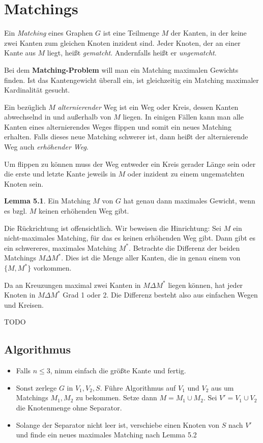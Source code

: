 \documentclass[10pt,a4paper]{article}
\begin{document}

\clearpage
\section{Matchings}
Ein \textit{Matching} eines Graphen $G$ ist eine Teilmenge $M$ der Kanten, in
der keine zwei Kanten zum gleichen Knoten inzident sind.
Jeder Knoten, der an einer Kante aus $M$ liegt, heißt \textit{gematcht}.
Andernfalls heißt er \textit{ungematcht}.

Bei dem \textbf{Matching-Problem} will man ein Matching maximalen Gewichts
finden.
Ist das Kantengewicht überall ein, ist gleichzeitig ein Matching maximaler
Kardinalität gesucht.

Ein bezüglich $M$ \textit{alternierender} Weg ist ein Weg oder Kreis, dessen
Kanten abwechselnd in und außerhalb von $M$ liegen.
In einigen Fällen kann man alle Kanten eines alternierendes Weges flippen und
somit ein neues Matching erhalten.
Falls dieses neue Matching schwerer ist, dann heißt der alternierende Weg auch
\textit{erhöhender Weg}.

Um flippen zu können muss der Weg entweder ein Kreis gerader Länge sein oder
die erste und letzte Kante jeweils in $M$ oder inzident zu einem ungematchten
Knoten sein.

\textbf{Lemma 5.1}. Ein Matching $M$ von $G$ hat genau dann maximales Gewicht,
wenn es bzgl. $M$ keinen erhöhenden Weg gibt.

Die Rückrichtung ist offensichtlich.
Wir beweisen die Hinrichtung:
Sei $M$ ein nicht-maximales Matching, für das es keinen erhöhenden Weg gibt.
Dann gibt es ein schwereres, maximales Matching $M^*$.
Betrachte die Differenz der beiden Matchings $M\Delta M^*$.
Dies ist die Menge aller Kanten, die in genau einem von $\{M, M^*\}$ vorkommen.

Da an Kreuzungen maximal zwei Kanten in $M\Delta M^*$ liegen können, hat jeder
Knoten in $M\Delta M^*$ Grad 1 oder 2.
Die Differenz besteht also aus einfachen Wegen und Kreisen.

TODO %

\subsection{Algorithmus}
\begin{itemize}
    \item Falls $n \leq 3$, nimm einfach die größte Kante und fertig.
    \item Sonst zerlege $G$ in $V_1, V_2, S$.
        Führe Algorithmus auf $V_1$ und $V_2$ aus um Matchings $M_1, M_2$ zu
        bekommen.
        Setze dann $M = M_1 \cup M_2$.
        Sei $V' = V_1 \cup V_2$ die Knotenmenge ohne Separator.
    \item Solange der Separator nicht leer ist, verschiebe einen Knoten von $S$
        nach $V'$ und finde ein neues maximales Matching nach Lemma 5.2
\end{itemize}
\end{document}
